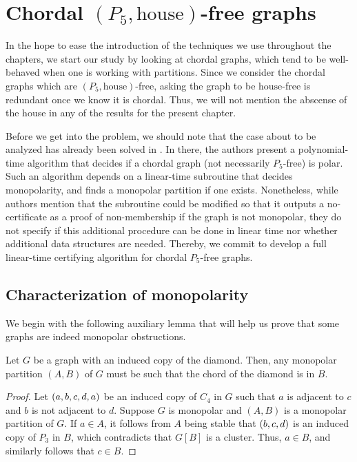 \chapter{Chordal \texorpdfstring{$(P_5,\text{house})$}{(P5,house)}-free graphs}
\label{cap:chordal}

In the hope to ease the introduction of the techniques we use throughout the
chapters, we start our study by looking at chordal graphs, which tend to be
well-behaved when one is working with partitions. Since we consider the chordal
graphs which are $(P_5,\text{house})$-free, asking the graph to be
$\text{house}$-free is redundant once we know it is chordal. Thus, we will not
mention the abscense of the house in any of the results for the present chapter.

Before we get into the problem, we should note that the case about to be
analyzed has already been solved in \cite{chordal}. In there, the authors
present a polynomial-time algorithm that decides if a chordal graph (not
necessarily $P_5$-free) is polar. Such an algorithm depends on a linear-time
subroutine that decides monopolarity, and finds a monopolar partition if one
exists. Nonetheless, while authors mention that the subroutine could be modified
so that it outputs a no-certificate as a proof of non-membership if the graph is
not monopolar, they do not specify if this additional procedure can be done in
linear time nor whether additional data structures are needed. Thereby, we
commit to develop a full linear-time certifying algorithm for chordal $P_5$-free
graphs.

\section{Characterization of monopolarity}
\label{sec:chordal_characterization}

We begin with the following auxiliary lemma that will help us prove that some
graphs are indeed monopolar obstructions.

\begin{lemma}
    \label{lem:monopolar_diamond}
    Let $G$ be a graph with an induced copy of the diamond. Then, any monopolar
    partition $(A,B)$ of $G$ must be such that the chord of the diamond is in
    $B$.
\end{lemma}

\begin{proof}
    Let $\left(a,b,c,d,a\right)$ be an induced copy of $C_4$ in $G$ such that $a$ is
    adjacent to $c$ and $b$ is not adjacent to $d$. Suppose $G$ is monopolar and
    $(A,B)$ is a monopolar partition of $G$. If $a\in A$, it follows from $A$
    being stable that $\left(b,c,d\right)$ is an induced copy of $P_3$ in $B$, which
    contradicts that $G[B]$ is a cluster. Thus, $a\in B$, and similarly follows
    that $c\in B$.

\end{proof}

